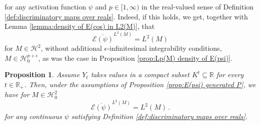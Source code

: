 \documentclass[11pt,a4paper,twoside,openany]{report}
\numberwithin{equation}{section}
\theoremstyle{plain} %
\newtheorem{proposition}[theorem]{Proposition}
\theoremstyle{definition} %
\theoremstyle{remark} %
\begin{document}
for any activation function \(\psi\) and \(p\in[1,\infty)\) in the real-valued sense of Definition \ref{def:discriminatory maps over reals}. Indeed, if this holds, we get, together with Lemma \ref{lemma:density of E(cos) in L2(M)}, that
\begin{equation*}
    \overline{\mathcal{E}(\psi)}^{L^2(M)}=L^2(M)
\end{equation*}
for \(M\in\mathcal{H}^2\), without additional \(\epsilon\)-infinitesimal integrability conditions, \(M\in\mathcal{H}_0^{p+\epsilon}\), as was the case in Proposition \ref{prop:Lp(M) density of E(psi)}.
\begin{proposition}\label{prop:density of E(psi) in L^2(M)}
    Assume \(Y_t\) takes values in a compact subset \(K^t\subseteq\mathbb{R}\) for every \(t\in\mathbb{R}_+\). Then, under the assumptions of Proposition \ref{prop:E(psi) generated P}, we have for \(M\in\mathcal{H}_0^2\)
    \begin{equation*}
        \overline{\mathcal{E}(\psi)}^{L^2(M)}=L^2(M)\,.
    \end{equation*}
    for any continuous \(\psi\) satisfying Definition \ref{def:discriminatory maps over reals}.
\end{proposition}
\end{document}
